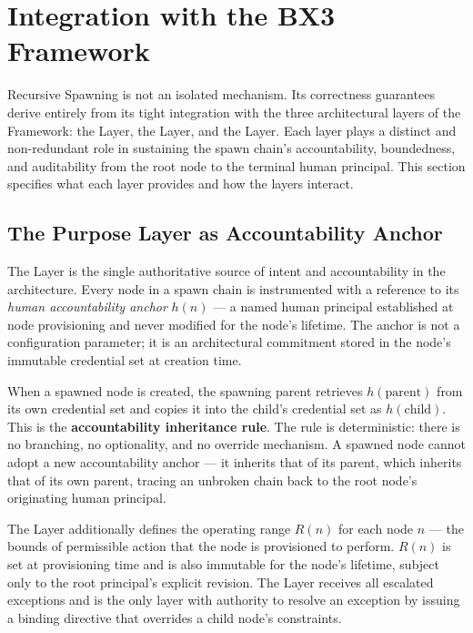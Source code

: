 \section{Integration with the BX3 Framework}
\label{sec:integration}

Recursive Spawning is not an isolated mechanism. Its correctness guarantees derive entirely from its tight integration with the three architectural layers of the \bxthree{} Framework: the \purpose{} Layer, the \bounds{} Layer, and the \fact{} Layer. Each layer plays a distinct and non-redundant role in sustaining the spawn chain's accountability, boundedness, and auditability from the root node to the terminal human principal. This section specifies what each layer provides and how the layers interact.

\subsection{The Purpose Layer as Accountability Anchor}
\label{sec:purpose-anchor}

The \purpose{} Layer is the single authoritative source of intent and accountability in the \bxthree{} architecture. Every node in a spawn chain is instrumented with a reference to its \emph{human accountability anchor} $h(n)$ — a named human principal established at node provisioning and never modified for the node's lifetime. The anchor is not a configuration parameter; it is an architectural commitment stored in the node's immutable credential set at creation time.

When a spawned node is created, the spawning parent retrieves $h(\text{parent})$ from its own credential set and copies it into the child's credential set as $h(\text{child})$. This is the \textbf{accountability inheritance rule}. The rule is deterministic: there is no branching, no optionality, and no override mechanism. A spawned node cannot adopt a new accountability anchor — it inherits that of its parent, which inherits that of its own parent, tracing an unbroken chain back to the root node's originating human principal.

The \purpose{} Layer additionally defines the operating range $R(n)$ for each node $n$ — the bounds of permissible action that the node is provisioned to perform. $R(n)$ is set at provisioning time and is also immutable for the node's lifetime, subject only to the root principal's explicit revision. The \purpose{} Layer receives all escalated exceptions and is the only layer with authority to resolve an exception by issuing a binding directive that overrides a child node's \bounds{} constraints.

